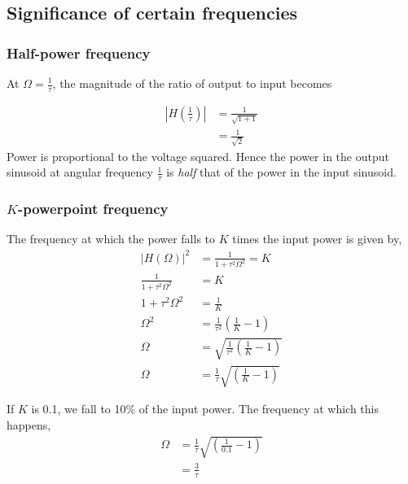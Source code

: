 \subsection{Significance of certain frequencies}

\subsubsection{Half-power frequency}
At $\Omega = \frac{1}{\tau}$, the magnitude of the ratio of output to input becomes

\begin{equation}
\begin{split}
|H(\frac{1}{\tau})| & = \frac{1}{\sqrt{{1 + 1}}}\\
									   & = \frac{1}{\sqrt{2}}
\end{split}
\end{equation}
Power is proportional to the voltage squared. Hence the power in the output sinusoid at angular frequency $\frac{1}{\tau}$ is \textit{half} that of the power in the input sinusoid. 
\subsubsection{$K$-powerpoint frequency}
The frequency at which the power falls to $K$ times the input power is given by,
\begin{equation}
\begin{split}
|H(\Omega)|^{2} & = \frac{1}{{1 + \tau^{2}\Omega^{2}}}  = K\\
\frac{1}{1 + \tau^{2}\Omega^{2}} & = K\\
1 + \tau^{2}\Omega^{2} & = \frac{1}{K}\\
\Omega^{2} & = \frac{1}{\tau^{2}}(\frac{1}{K} - 1)\\
\Omega & = \sqrt{\frac{1}{\tau^{2}}(\frac{1}{K} - 1)}\\
\Omega & = \frac{1}{\tau}\sqrt{(\frac{1}{K} - 1)}
\end{split}
\end{equation}

If $K$ is 0.1, we fall to 10\% of the input power. The frequency at which this happens,
\begin{equation}
\begin{split}
\Omega & = \frac{1}{\tau}\sqrt{(\frac{1}{0.1} - 1)}\\
       & = \frac{3}{\tau}
\end{split}
\end{equation}

